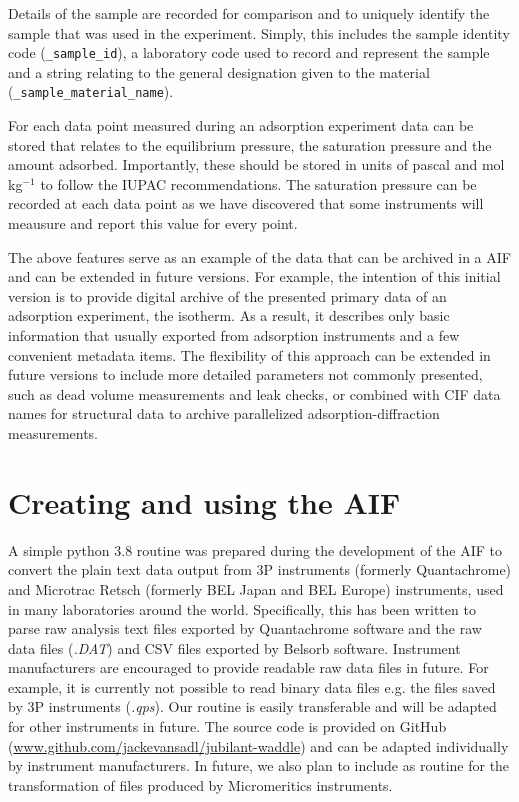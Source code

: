 \documentclass[journal=langd5,manuscript=article]{achemso}
\begin{document}
Details of the sample are recorded for comparison and to uniquely identify the sample that was used in the experiment.
Simply, this includes the sample identity code (\texttt{\_sample\_id}), a laboratory code used to record and represent the sample and a string relating to the general designation given to the material (\texttt{\_sample\_material\_name}).

For each data point measured during an adsorption experiment data can be stored that relates to the equilibrium pressure, the saturation pressure and the amount adsorbed. Importantly, these should be stored in units of pascal and mol$\,$kg$^{-1}$ to follow the IUPAC recommendations.\cite{10.1515/pac-2014-1117}
The saturation pressure can be recorded at each data point as we have discovered that some instruments will meausure and report this value for every point.

The above features serve as an example of the data that can be archived in a AIF and can be extended in future versions.
For example, the intention of this initial version is to provide digital archive of the presented primary data of an adsorption experiment, the isotherm.
As a result, it describes only basic information that usually exported from adsorption instruments and a few convenient metadata items.
The flexibility of this approach can be extended in future versions to include more detailed parameters not commonly presented, such as dead volume measurements and leak checks, or combined with CIF data names for structural data to archive parallelized adsorption-diffraction measurements.

\section{Creating and using the AIF}
A simple python 3.8 routine was prepared during the development of the AIF to convert the plain text data output from 3P instruments (formerly Quantachrome) and Microtrac Retsch (formerly BEL Japan and BEL Europe) instruments, used in many laboratories around the world.
Specifically, this has been written to parse raw analysis text files exported by Quantachrome software and the raw data files (\textit{.DAT}) and CSV files exported by Belsorb software.
Instrument manufacturers are encouraged to provide readable raw data files in future.
For example, it is currently not possible to read binary data files e.g. the files saved by 3P instruments (\textit{.qps}).
Our routine is easily transferable and will be adapted for other instruments in future.
The source code is provided on GitHub (\url{www.github.com/jackevansadl/jubilant-waddle}) and can be adapted individually by instrument manufacturers.
In future, we also plan to include as routine for the transformation of files produced by Micromeritics instruments.
\end{document}

